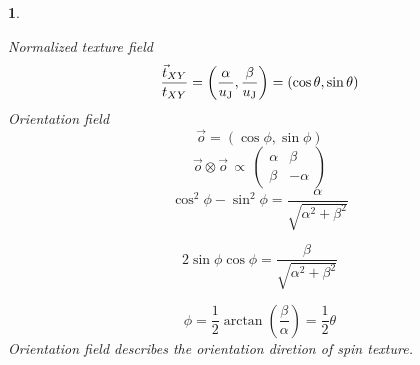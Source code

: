 \documentclass[12pt]{article}
\theoremstyle{problemstyle}
\newtheorem{problem}{}
\begin{document}
\begin{problem}
\begin{itemize}
        Normalized texture field
        \begin{equation}
            \frac{\vec{t}_{XY}}{t_{XY}} = \left( \frac{\alpha}{u_{\rm{J}}}, \frac{\beta}{u_{\rm{J}}} \right) = \left( {\cos \theta, \sin \theta} \right)
        \end{equation}
        Orientation field
        \begin{equation}
            \vec{o} = \left( {\cos \phi, \sin \phi} \right)
        \end{equation}
        \begin{equation}
        \vec{o}\otimes\vec{o} \, \propto \, \begin{pmatrix} \alpha & \beta \\ \beta & -\alpha \end{pmatrix}
        \end{equation}
        \begin{equation}
            \cos^2\phi - \sin^2\phi =  \frac{\alpha}{\sqrt{\alpha^2 + \beta^2}}
        \end{equation}

        \begin{equation}
            2\sin\phi\cos\phi = \frac{\beta}{\sqrt{\alpha^2 + \beta^2}}
        \end{equation}

        \begin{equation}
            \phi = \frac{1}{2} \arctan \left( \frac{\beta}{\alpha} \right) = \frac{1}{2} \theta
        \end{equation}
        Orientation field describes the orientation diretion of spin texture.
        
    \end{itemize}
\end{problem}
\end{document}
